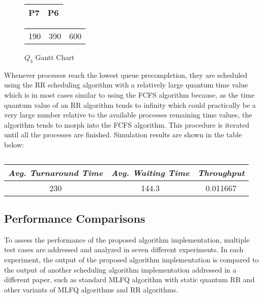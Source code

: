 \documentclass[conference]{IEEEtran}
\newcommand\T{\rule{0pt}{2.6ex}}       %
\newcommand\B{\rule[-1.2ex]{0pt}{0pt}} %
\begin{document}
\begin{figure}[H]
    \begin{center}
    \begin{tabular}{|c|c|}
     \hline
        P7 & P6\T\B\\ 
     \hline
    \end{tabular}
    \end{center}
    \begin{center}
        \begin{tabular}{c c c}
               190 & 390 & 600\\ 
        \end{tabular}
    \end{center}
\caption{$Q_{3}$ Gantt Chart}
\end{figure}

Whenever processes reach the lowest queue precompletion, they are scheduled using the RR scheduling algorithm with a relatively large quantum time value which is in most cases similar to using the FCFS algorithm because, as the time quantum value of an RR algorithm tends to infinity which could practically be a very large number relative to the available processes remaining time values, the algorithm tends to morph into the FCFS algorithm. This procedure is iterated until all the processes are finished. Simulation results are shown in the table below:

\begin{table}[H]
    \caption{}
    \centering
     \begin{tabular}{||c c c||} 
     \hline
     \textit{\textbf{Avg. Turnaround Time}} & \textit{\textbf{Avg. Waiting Time}} & \textit{\textbf{Throughput}}\T \B \\ 
     \hline
     \hline
     230 & 144.3 & 0.011667 \T \B \\ 
     \hline
     \end{tabular}
\end{table}


\subsection{Performance Comparisons}

To assess the performance of the proposed algorithm implementation, multiple test cases are addressed and analyzed in seven different experiments. In each experiment, the output of the proposed algorithm implementation is compared to the output of another scheduling algorithm implementation addressed in a different paper, such as standard MLFQ algorithm with static quantum RR and other variants of MLFQ algorithms and RR algorithms.
\end{document}
